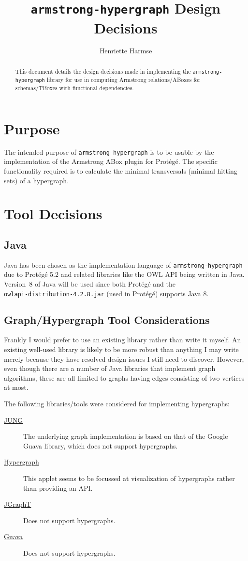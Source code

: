 \documentclass[a4paper,10pt,final,onecolumn]{llncs}
\title{\texttt{armstrong-hypergraph} Design Decisions}
\author{Henriette Harmse\institute{\href{https://henrietteharmse.com}{HenrietteHarmse.com}}}
\begin{document}
    
  \maketitle
  \begin{abstract}
This document details the design decisions made in implementing the \texttt{armstrong-hypergraph} library for use in computing Armstrong relations/ABoxes for schemas/TBoxes with functional dependencies.
  \end{abstract}
  
  \section{Purpose} \label{sec_Introduction}
  The intended purpose of \texttt{armstrong-hypergraph} is to be usable by the implementation of the Armstrong ABox plugin for Prot\'{e}g\'{e}. The specific functionality required is to calculate the minimal transversals (minimal hitting sets) of a hypergraph.
  
  \section{Tool Decisions}
  \subsection{Java}
  Java has been chosen as the implementation language of \texttt{armstrong-hypergraph} due to Prot\'{e}g\'{e} 5.2 and related libraries like the OWL API being written in Java. Version~8 of Java will be used since both Prot\'{e}g\'{e} and the \\
  \texttt{owlapi-distribution-4.2.8.jar} (used in Prot\'{e}g\'{e}) supports Java 8.
  
  
  \subsection{Graph/Hypergraph Tool Considerations}
  Frankly I would prefer to use an existing library rather than write it myself. An existing well-used library is likely to be more robust than anything I may write merely because they have resolved design issues I still need to discover. However, even though there are a number of Java libraries that implement graph algorithms, these are all limited to graphs having edges consisting of two vertices at most. 
 
  The following libraries/tools were considered for implementing hypergraphs:
  \begin{description}
   \item[\href{https://github.com/jrtom/jung}{JUNG}] The underlying graph implementation is based on that of the Google Guava library, which does not support hypergraphs.
   \item[\href{http://hypergraph.sourceforge.net/}{Hypergraph}] This applet seems to be focussed at visualization of hypergraphs rather than providing an API.
   \item[\href{http://jgrapht.org/}{JGraphT}] Does not support hypergraphs.
   \item[\href{https://github.com/google/guava}{Guava}] Does not support hypergraphs.
  \end{description}
  
\end{document}
